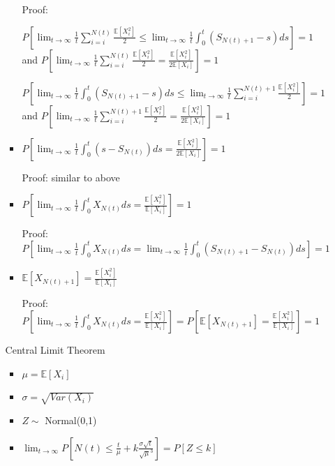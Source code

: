 \documentclass[a4paper]{article}
\begin{document}
\begin{itemize}
\begin{itemize}
\begin{itemize}
                        Proof:

                        $P[\lim_{t \rightarrow \infty} \frac{1}{t} \sum_{i = i}^{N(t)} \frac{\mathbb{E}[X_i^2]}{2} \leq \lim_{t \rightarrow \infty} \frac{1}{t} \int_0^t (S_{N(t) + 1} - s) ds] = 1$ and $P[\lim_{t \rightarrow \infty} \frac{1}{t} \sum_{i = i}^{N(t)} \frac{\mathbb{E}[X_i^2]}{2} = \frac{\mathbb{E}[X_i^2]}{2\mathbb{E}[X_i]}] = 1$

                        $P[\lim_{t \rightarrow \infty} \frac{1}{t} \int_0^t (S_{N(t) + 1} - s) ds \leq \lim_{t \rightarrow \infty} \frac{1}{t} \sum_{i = i}^{N(t) + 1} \frac{\mathbb{E}[X_i^2]}{2}] = 1$ and $P[\lim_{t \rightarrow \infty} \frac{1}{t} \sum_{i = i}^{N(t) + 1} \frac{\mathbb{E}[X_i^2]}{2} = \frac{\mathbb{E}[X_i^2]}{2\mathbb{E}[X_i]}] = 1$
                    \item $P[\lim_{t \rightarrow \infty} \frac{1}{t} \int_0^t (s - S_{N(t)}) ds = \frac{\mathbb{E}[X_i^2]}{2\mathbb{E}[X_i]}] = 1$

                        Proof: similar to above
                    \item $P[\lim_{t \rightarrow \infty} \frac{1}{t} \int_0^t X_{N(t)} ds = \frac{\mathbb{E}[X_i^2]}{\mathbb{E}[X_i]}] = 1$

                        Proof: $P[\lim_{t \rightarrow \infty} \frac{1}{t} \int_0^t X_{N(t)} ds = \lim_{t \rightarrow \infty} \frac{1}{t} \int_0^t (S_{N(t) + 1} - S_{N(t)}) ds] = 1$
                    \item $\mathbb{E}[X_{N(t) + 1}] = \frac{\mathbb{E}[X_i^2]}{\mathbb{E}[X_i]}$

                        Proof: $P[\lim_{t \rightarrow \infty} \frac{1}{t} \int_0^t X_{N(t)} ds = \frac{\mathbb{E}[X_i^2]}{\mathbb{E}[X_i]}] = P[\mathbb{E}[X_{N(t) + 1}] = \frac{\mathbb{E}[X_i^2]}{\mathbb{E}[X_i]}] = 1$
                \end{itemize}
                Central Limit Theorem
                \begin{itemize}
                    \item $\mu = \mathbb{E}[X_i]$
                    \item $\sigma = \sqrt{\mathit{Var}(X_i)}$
                    \item $Z \sim$ Normal(0,1)
                    \item $\lim_{t \rightarrow \infty} P[N(t) \leq \frac{t}{\mu} + k \frac{\sigma \sqrt{t}}{\sqrt{\mu}^3}] = P[Z \leq k]$


\end{itemize}
\end{itemize}
\end{itemize}
\end{document}
